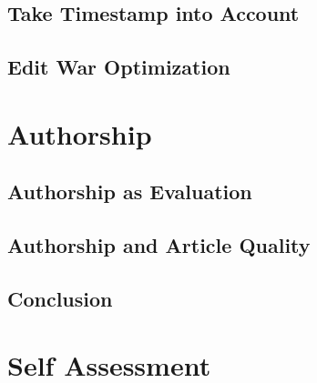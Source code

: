 \documentclass[preprint,review,12pt]{elsarticle}
\begin{document}
\subsection{Take Timestamp into Account}

\subsection{Edit War Optimization}

\section{Authorship}

\subsection{Authorship as Evaluation}

\subsection{Authorship and Article Quality}

\subsection{Conclusion}

\section{Self Assessment}





% 



\section{\refname}


\end{document}
